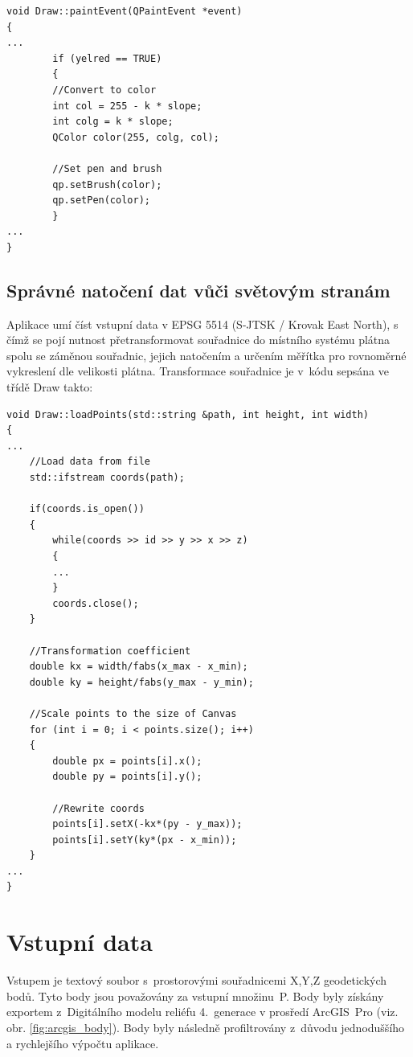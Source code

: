 \documentclass[a4paper, 12pt, oneside, titlepage]{article} %
\begin{document}
\begin{verbatim}
void Draw::paintEvent(QPaintEvent *event)
{
...
        if (yelred == TRUE)
        {
        //Convert to color
        int col = 255 - k * slope;
        int colg = k * slope;
        QColor color(255, colg, col);

        //Set pen and brush
        qp.setBrush(color);
        qp.setPen(color);
        }
...
}
\end{verbatim}

\subsection{Správné natočení dat vůči světovým stranám}
Aplikace umí číst vstupní data v EPSG 5514 (S-JTSK / Krovak East North), s čímž se pojí nutnost přetransformovat souřadnice do místního systému plátna spolu se záměnou souřadnic, jejich natočením a určením měřítka pro rovnoměrné vykreslení dle velikosti plátna. Transformace souřadnice je v~kódu sepsána ve třídě Draw takto: 

\begin{verbatim}
void Draw::loadPoints(std::string &path, int height, int width)
{
...
    //Load data from file
    std::ifstream coords(path);

    if(coords.is_open())
    {
        while(coords >> id >> y >> x >> z)
        {
        ...
        }
        coords.close();
    }

    //Transformation coefficient
    double kx = width/fabs(x_max - x_min);
    double ky = height/fabs(y_max - y_min);

    //Scale points to the size of Canvas
    for (int i = 0; i < points.size(); i++)
    {
        double px = points[i].x();
        double py = points[i].y();

        //Rewrite coords
        points[i].setX(-kx*(py - y_max));
        points[i].setY(ky*(px - x_min));
    }
...
}
\end{verbatim}


\section{Vstupní data}
Vstupem je textový soubor s~prostorovými souřadnicemi X,Y,Z geodetických bodů. Tyto body jsou považovány za vstupní množinu~P. Body byly získány exportem z~Digitálního modelu reliéfu 4.~generace \cite{ZABAGED} v prosředí ArcGIS~Pro \cite{arcgispro} (viz. obr. \ref{fig:arcgis_body}). Body byly následně profiltrovány z~důvodu jednoduššího a rychlejšího výpočtu aplikace.
\end{document}
